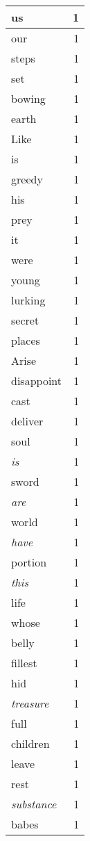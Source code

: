 \begin{center}
\begin{longtable}{l|r}
us & 1 \\ \hline
our & 1 \\ \hline
steps & 1 \\ \hline
set & 1 \\ \hline
bowing & 1 \\ \hline
earth & 1 \\ \hline
Like & 1 \\ \hline
is & 1 \\ \hline
greedy & 1 \\ \hline
his & 1 \\ \hline
prey & 1 \\ \hline
it & 1 \\ \hline
were & 1 \\ \hline
young & 1 \\ \hline
lurking & 1 \\ \hline
secret & 1 \\ \hline
places & 1 \\ \hline
Arise & 1 \\ \hline
disappoint & 1 \\ \hline
cast & 1 \\ \hline
deliver & 1 \\ \hline
soul & 1 \\ \hline
\emph{is} & 1 \\ \hline
sword & 1 \\ \hline
\emph{are} & 1 \\ \hline
world & 1 \\ \hline
\emph{have} & 1 \\ \hline
portion & 1 \\ \hline
\emph{this} & 1 \\ \hline
life & 1 \\ \hline
whose & 1 \\ \hline
belly & 1 \\ \hline
fillest & 1 \\ \hline
hid & 1 \\ \hline
\emph{treasure} & 1 \\ \hline
full & 1 \\ \hline
children & 1 \\ \hline
leave & 1 \\ \hline
rest & 1 \\ \hline
\emph{substance} & 1 \\ \hline
babes & 1 \\ \hline
\end{longtable}
\end{center}



